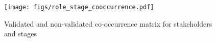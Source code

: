 

\begin{figure}
     \centering
     \texttt{[image: figs/role\_stage\_cooccurrence.pdf]}
     \caption{Validated and non-validated co-occurrence matrix for stakeholders and stages}
     \label{fig:roles_stages_sbs}
\end{figure}

